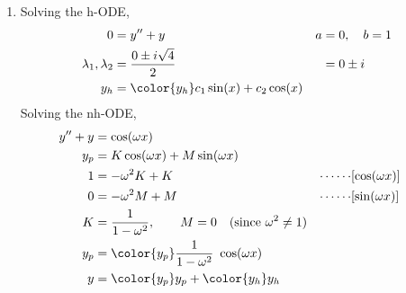\begin{enumerate}
    \item Solving the h-ODE,
          \begin{align}
              0                        & = y'' + y                                 &
              a                        & = 0, \quad b = 1                            \\
              \lambda_{1}, \lambda_{2} & = \frac{0 \pm i\sqrt{4}}{2}               &
                                       & = 0 \pm i                                   \\
              y_{h}                    & = \color{y_h} c_{1}\sin(x) + c_{2}\cos(x)
          \end{align}
          Solving the nh-ODE,
          \begin{align}
              y'' + y      & = \cos(\omega x)                                         \\
              y_{p}        & = K \cos(\omega x) + M \sin(\omega x)                    \\
              1            & = -\omega^{2}K + K                                     &
              \cdots\cdots & [\cos(\omega x)]                                         \\
              0            & = -\omega^{2}M + M                                     &
              \cdots\cdots & [\sin(\omega x)]                                         \\
              K            & = \frac{1}{1 - \omega^{2}},
              \qquad M = 0 \quad (\text{since}\ \omega^{2} \neq 1)                    \\
              y_{p}        & = \color{y_p} \frac{1}{1 - \omega^{2}}\ \cos(\omega x)   \\
              y            & = {\color{y_p} y_{p}} + {\color{y_h} y_{h}}
          \end{align}


\end{enumerate}
